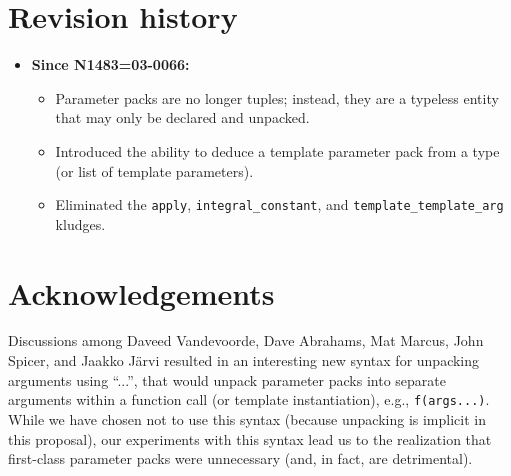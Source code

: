 \documentclass{article}
\begin{document}
\section{Revision history}
\begin{itemize}
\item \textbf{Since N1483=03-0066:} 
  \begin{itemize}
  \item Parameter packs are no longer tuples; instead, they are a
    typeless entity that may only be declared and unpacked.
  \item Introduced the ability to deduce a template parameter pack
    from a type (or list of template parameters).
  \item Eliminated the \texttt{apply}, \texttt{integral\_constant},
    and \texttt{template\_template\_arg} kludges.
  \end{itemize}
\end{itemize}

\section{Acknowledgements}
Discussions among Daveed Vandevoorde, Dave Abrahams, Mat Marcus, John
Spicer, and Jaakko J\"arvi resulted in an interesting new syntax for
unpacking arguments using ``...'', that would unpack parameter packs
into separate arguments within a function call (or template
instantiation), e.g., \texttt{f(args...)}. While we have chosen not to
use this syntax (because unpacking is implicit in this proposal), our
experiments with this syntax lead us to the realization that
first-class parameter packs were unnecessary (and, in fact, are
detrimental).




\end{document}
